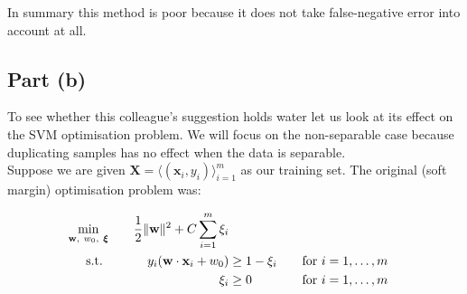In summary this method is poor because it does not take false-negative error into account at all.

\subsection{Part (b)}

To see whether this colleague's suggestion holds water let us look at its effect on the SVM optimisation problem. We will focus on the non-separable case because duplicating samples has no effect when the data is separable.\\[1em]

Suppose we are given $\mathbf{X}=\langle(\mathbf{x}_i,y_i)\rangle_{i=1}^m$ as our training set. The original (soft margin) optimisation problem was:

\begin{alignat*}{3}
  \min_{\mathbf{w},~w_0,~\boldsymbol\xi}\quad&&\frac{1}{2}\lVert\mathbf{w}\rVert^2 + C\sum_{i=1}^m\xi_i\\
  \text{s.t. }\quad&&y_i(\mathbf{w}\cdot\mathbf{x}_i+w_0) & \geq 1 - \xi_i &&\quad\text{for }i = 1,\ldots,m
  \\ &&\xi_i & \geq 0 &&\quad\text{for }i=1,\ldots,m
\end{alignat*}

